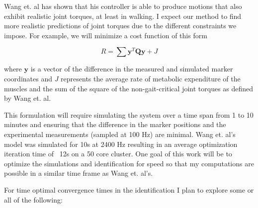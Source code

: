 \documentclass[11pt]{article}
\begin{document}
Wang et. al has shown that his controller is able to produce motions that also
exhibit realistic joint torques, at least in walking. I expect our method to
find more realistic predictions of joint torques due to the different
constraints we impose. For example, we will minimize a cost function of this form

\begin{equation}
  R = \sum \mathbf{y}^T\mathbf{Q}\mathbf{y} + J
\end{equation}

where $\mathbf{y}$ is a vector of the difference in the measured and simulated
marker coordinates and $J$ represents the average rate of metabolic expenditure
of the muscles and the sum of the square of the non-gait-critical joint torques
as defined by Wang et. al.

This formulation will require simulating the system over a time span from 1 to
10 minutes and ensuring that the difference in the marker positions and the
experimental measurements (sampled at 100 Hz) are minimal. Wang et. al's model
was simulated for 10s at 2400 Hz resulting in an average optimization iteration
time of ~12s on a 50 core cluster. One goal of this work will be to optimize
the simulations and identification for speed so that my computations are
possible in a similar time frame as Wang et. al's.

For time optimal convergence times in the identification I plan to explore some
or all of the following:
\end{document}
